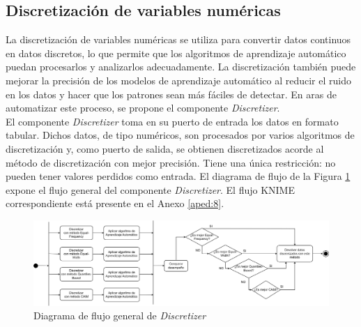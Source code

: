 \subsection{Discretización de variables numéricas} 
La discretización de variables numéricas se utiliza para convertir datos continuos en datos discretos, lo que permite que los algoritmos de aprendizaje automático puedan procesarlos y analizarlos adecuadamente. La discretización también puede mejorar la precisión de los modelos de aprendizaje automático al reducir el ruido en los datos y hacer que los patrones sean más fáciles de detectar. En aras de automatizar este proceso, se propone el componente \textit{Discretizer}. \\
El componente \textit{Discretizer} toma en su puerto de entrada los datos en formato tabular. Dichos datos, de tipo numéricos, son procesados por varios algoritmos de discretización y, como puerto de salida, se obtienen discretizados acorde al método de discretización con mejor precisión. Tiene una única restricción: no pueden tener valores perdidos como entrada. El diagrama de flujo de la Figura \ref{fig:discretizacion} expone el flujo general del componente \textit{Discretizer}. El flujo KNIME correspondiente está presente en el Anexo \ref{aped:8}. 

\begin{figure}[H]
	\centering
	\includegraphics[width=1\linewidth]{"figuras/capi 2/preprocesado/discretizacion.drawio"}
	\caption{Diagrama de flujo general de \textit{Discretizer}}
	\label{fig:discretizacion}
\end{figure}

